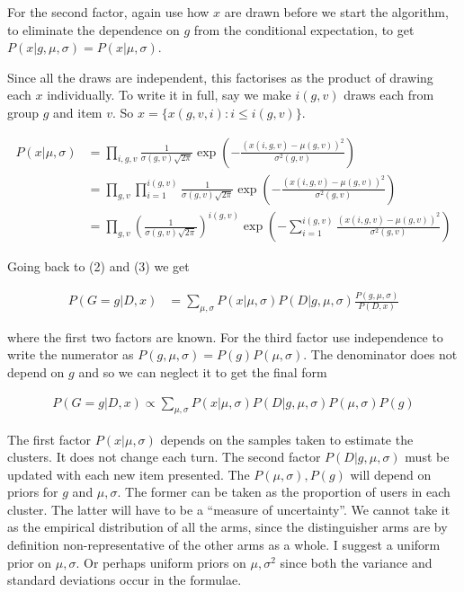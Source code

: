 \documentclass[12pt]{article}
\theoremstyle{definition}
\newcommand{\si}{\ensuremath{\sigma}}
\newcommand{\0}{\ensuremath{\varnothing}}
\newcommand{\1}{{\bf 1}}
\begin{document}
  
  For the second factor, again use how $x$ are drawn before we start the algorithm, to eliminate the dependence on $g$ from the conditional expectation, to get $P(x|  g,       \mu,    \si  ) = P(x|       \mu,  \si  )$.
  
  Since all the draws are independent, this factorises as the product of drawing each $x$ individually. To write it in full, say we make $i(g,v)$ draws each from group $g$ and item $v$. So $x = \{x(g,v,i): i \le i(g,v)\}$. 
  
  
  \begin{align*}
   P(x|         \mu,  \si  ) &= \prod_{i,g,v}   \frac{ 1}{\si(g,v) \sqrt{2 \pi}} \exp \left( -\frac{(x(i,g,v) - \mu(g,v))^2}{\si^2(g,v)}\right)  \\ &= \prod_{g,v} \prod_{i=1}^{i(g,v)}   \frac{ 1}{\si(g,v) \sqrt{2 \pi}} \exp \left( -\frac{(x(i,g,v) - \mu(g,v))^2}{\si^2(g,v)}\right) \\ &= \prod_{g,v}  \left(  \frac{ 1 }{\si(g,v) \sqrt{2 \pi}} \right)^{i(g,v)}\exp \left( -\sum_{i=1}^{i(g,v)} \frac{(x(i,g,v) - \mu(g,v))^2}{\si^2(g,v)}\right) 
  \end{align*}

  Going back to (2) and (3) we get
   
  
  
  \begin{align}
   P(G=g| D, x) &= \sum_{\mu,\si} P( x|        \mu,    \si  ) P(D |  g,       \mu,    \si  ) \frac{P(g,        \mu,    \si ) }{P(  D, x) }
  \end{align}
  
  where the first two factors are known. For the third factor use independence to write the numerator as $P(g,        \mu,    \si ) =  P(g)       P (\mu,    \si )$. The denominator does not depend on $g$ and so we can neglect it to get the final form
  
  \begin{align}
   P(G=g| D, x) \propto \sum_{\mu,\si} P( x|        \mu,    \si  ) P(D |  g,       \mu,    \si  )   P(\mu ,\sigma)  P(g)
  \end{align}
  
   
  
  The first factor $P( x|        \mu,    \si  ) $ depends on the samples taken to estimate the clusters. It does not change each turn.  The second factor $P(D |  g,       \mu,    \si  ) $ must be updated with each new item presented. The $  P(\mu,\sigma), P(g)$ will depend on priors for $g$ and $\mu,\si$. The former can be taken as the proportion of users in each cluster. The latter will have to be a ``measure of uncertainty''. We cannot take it as the empirical distribution of all the arms, since the distinguisher arms are by definition non-representative of the other arms as a whole. I suggest a uniform prior on $\mu,\si$. Or perhaps uniform priors on $\mu,\si^2$ since both the variance and standard deviations occur in the formulae.
  
\end{document}
